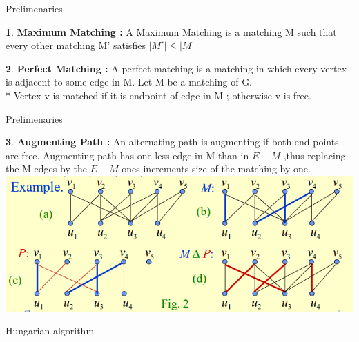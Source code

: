 \documentclass[11pt]{beamer}
\theoremstyle{definition}
\newtheorem{defn}{}%
\begin{document}
\begin{frame}{Prelimenaries}



\begin{defn}{\textbf{Maximum Matching :}}
A Maximum Matching is a matching M such that every other matching M' satisfies $|M'|\leq|M|$
\end{defn}
\begin{defn}{\textbf{Perfect Matching :}}
A perfect matching is a matching in which every vertex is adjacent to some edge in M.
Let M be a matching of G.\\*
Vertex v is matched if it is endpoint of edge in M ; otherwise v is free.
\end{defn}


\end{frame}

\begin{frame}{Prelimenaries}



\begin{defn}{\textbf{Augmenting Path :}}
An alternating path is augmenting if both end-points are free.
Augmenting path has one less edge in M than in
$E - M$ ,thus replacing the M edges by the $E - M$ ones increments size of the matching by one.
\includegraphics[width=1\textwidth]{augpath}\cite{hopcroft}
\end{defn}
\end{frame}

\begin{frame}
\begin{center}


\Huge{Hungarian algorithm}
\end{center}
\end{frame}
\end{document}
